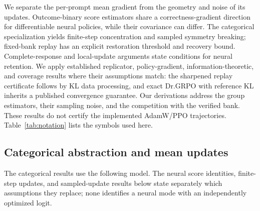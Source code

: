 \documentclass{article}
\newcommand{\1}{\mathbf 1}
\theoremstyle{remark}
\theoremstyle{definition}
\theoremstyle{plain}
\begin{document}
We separate the per-prompt mean gradient from the geometry and noise of its
updates. Outcome-binary score estimators share a correctness-gradient
direction for differentiable neural policies, while their covariance can
differ. The categorical specialization yields finite-step concentration and
sampled symmetry breaking; fixed-bank replay has an explicit restoration
threshold and recovery bound. Complete-response and local-update arguments
state conditions for neural retention. We apply established replicator,
policy-gradient, information-theoretic, and coverage results where their
assumptions match: the sharpened replay certificate follows by KL data
processing, and exact Dr.GRPO with reference KL inherits a published
convergence guarantee. Our derivations address the group estimators, their
sampling noise, and the competition with the verified bank. These results
do not certify the implemented AdamW/PPO trajectories.
Table~\ref{tab:notation} lists the symbols used here.

\subsection{Categorical abstraction and mean updates}
\label{app:theory-grpo-mean}

The categorical results use the following model. The neural score identities,
finite-step updates, and sampled-update results below state separately which
assumptions they replace; none identifies a neural mode with an independently
optimized logit.
\end{document}
